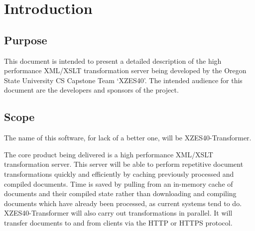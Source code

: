 \section{Introduction}

\subsection{Purpose}

This document is intended to present a detailed description of the high performance XML/XSLT transformation server being developed by the Oregon State University CS Capstone Team `XZES40'.
The intended audience for this document are the developers and sponsors of the project.


\subsection{Scope}

The name of this software, for lack of a better one, will be XZES40-Transformer.

The core product being delivered is a high performance XML/XSLT transformation server.
This server will be able to perform repetitive document transformations quickly and efficiently by caching previously processed and compiled documents.
Time is saved by pulling from an in-memory cache of documents and their compiled state rather than downloading and compiling documents which have already been processed, as current systems tend to do.
XZES40-Transformer will also carry out transformations in parallel.
It will transfer documents to and from clients via the HTTP or HTTPS protocol.

